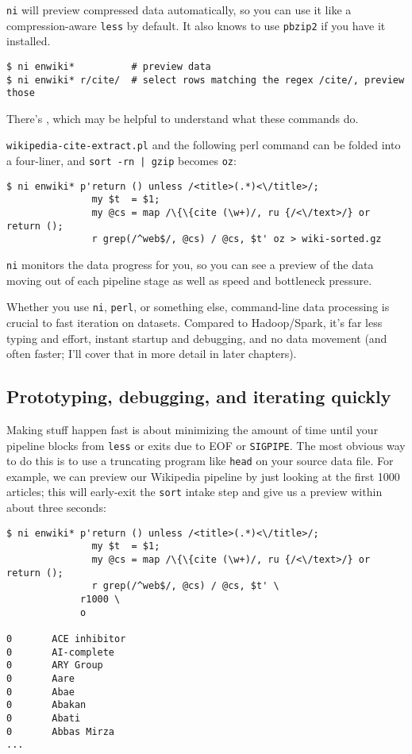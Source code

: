 {\tt ni} will preview compressed data automatically, so you can use it like a
compression-aware {\tt less} by default. It also knows to use {\tt pbzip2} if
you have it installed.

\begin{verbatim}
$ ni enwiki*          # preview data
$ ni enwiki* r/cite/  # select rows matching the regex /cite/, preview those \end{verbatim}

There's
, which may be helpful to understand what
these commands do.

{\tt wikipedia-cite-extract.pl} and the following perl command can be folded
into a four-liner, and \verb/sort -rn | gzip/ becomes {\tt oz}:

\begin{verbatim}
$ ni enwiki* p'return () unless /<title>(.*)<\/title>/;
               my $t  = $1;
               my @cs = map /\{\{cite (\w+)/, ru {/<\/text>/} or return ();
               r grep(/^web$/, @cs) / @cs, $t' oz > wiki-sorted.gz\end{verbatim}

{\tt ni} monitors the data progress for you, so you can see a preview of the
data moving out of each pipeline stage as well as speed and bottleneck pressure.

Whether you use {\tt ni}, {\tt perl}, or something else, command-line data
processing is crucial to fast iteration on datasets. Compared to Hadoop/Spark,
it's far less typing and effort, instant startup and debugging, and no data
movement (and often faster; I'll cover that in more detail in later chapters).

\subsection{Prototyping, debugging, and iterating quickly}
Making stuff happen fast is about minimizing the amount of time until your
pipeline blocks from {\tt less} or exits due to EOF or {\tt SIGPIPE}. The most
obvious way to do this is to use a truncating program like {\tt head} on your
source data file. For example, we can preview our Wikipedia pipeline by just
looking at the first 1000 articles; this will early-exit the {\tt sort} intake
step and give us a preview within about three seconds:

\begin{verbatim}
$ ni enwiki* p'return () unless /<title>(.*)<\/title>/;
               my $t  = $1;
               my @cs = map /\{\{cite (\w+)/, ru {/<\/text>/} or return ();
               r grep(/^web$/, @cs) / @cs, $t' \
             r1000 \
             o

0       ACE inhibitor
0       AI-complete
0       ARY Group
0       Aare
0       Abae
0       Abakan
0       Abati
0       Abbas Mirza
... \end{verbatim}

